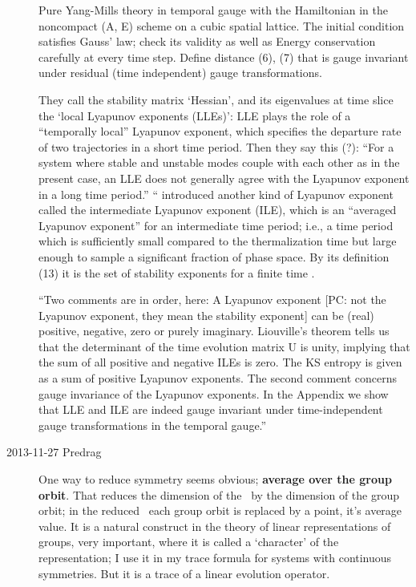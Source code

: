 \begin{description}
Pure Yang-Mills theory in temporal gauge with the Hamiltonian in the
noncompact (A, E) scheme on a cubic spatial lattice. The initial
condition satisfies Gauss' law; check its validity as well as Energy
conservation carefully at every time step. Define distance (6), (7) that
is gauge invariant under residual (time independent) gauge transformations.

                                                    \inCB
They call the stability matrix `Hessian', and its eigenvalues at time
slice the `local Lyapunov exponents (LLEs)': LLE plays the
role of a ``temporally local'' Lyapunov exponent, which specifies the
departure rate of two trajectories in a short time period. Then they say
this (?): ``For a system where stable and unstable modes couple with each
other as in the present case, an LLE does not generally agree with the
Lyapunov exponent in a long time period.'' `` introduced
another kind of Lyapunov exponent called the intermediate Lyapunov
exponent (ILE), which is an ``averaged Lyapunov exponent'' for an
intermediate time period; i.e., a time period which is sufficiently small
compared to the thermalization time but large enough to sample a
significant fraction of phase space. By its definition (13) it
is the set of stability exponents for a finite time \jacobianM.

``Two comments are in order, here: A Lyapunov exponent [PC: not the
Lyapunov exponent, they mean the stability exponent] can be (real)
positive, negative, zero or purely imaginary. Liouville's theorem tells
us that the determinant of the time evolution matrix U is unity, implying
that the sum of all positive and negative ILEs is zero. The KS entropy is
given as a sum of positive Lyapunov exponents. The second comment
concerns gauge invariance of the Lyapunov exponents. In the Appendix we
show that LLE and ILE are indeed gauge invariant under time-independent
gauge transformations in the temporal gauge.''

\item[2013-11-27  Predrag] One way to reduce symmetry seems obvious;
\textbf{average over the group orbit}. That reduces the dimension of the \statesp\
by the dimension of the group orbit; in the reduced \statesp\ each group
orbit is replaced by a point, it's average value. It is a natural construct
in the theory of linear
representations of groups, very important, where it is called a
`character' of the representation; I use it in my
 {trace formula} for
systems with continuous symmetries. But it is a trace of a linear evolution
operator.


\end{description}
